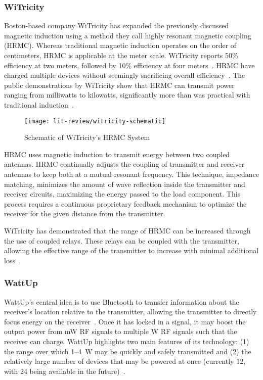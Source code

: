 \subsubsection{WiTricity}
Boston-based company WiTricity has expanded the previously discussed magnetic induction using a method they call highly resonant magnetic coupling (HRMC). Whereas traditional magnetic induction operates on the order of centimeters, HRMC is applicable at the meter scale. WiTricity reports 50\% efficiency at two meters, followed by 10\% efficiency at four meters~\cite{kesler_highly_2013,tucker_contribution_2013}. HRMC have charged multiple devices without seemingly sacrificing overall efficiency~\cite{kesler_highly_2013}. The public demonstrations by WiTricity show that HRMC can transmit power ranging from milliwatts to kilowatts, significantly more than was practical with traditional induction~\cite{kesler_highly_2013}.

\begin{figure}[t]
\centering
\texttt{[image: lit-review/witricity-schematic]}
    \caption[WiTricity schematic]{Schematic of WiTricity's HRMC System~\cite{kesler_highly_2013}}
    \label{fig:lit-review-witricity-schematic}
\end{figure}

HRMC uses magnetic induction to transmit energy between two coupled antennas. HRMC continually adjusts the coupling of transmitter and receiver antennas to keep both at a mutual resonant frequency. This technique, impedance matching, minimizes the amount of wave reflection inside the transmitter and receiver circuits, maximizing the energy passed to the load component. This process requires a continuous proprietary feedback mechanism to optimize the receiver for the given distance from the transmitter.

WiTricity has demonstrated that the range of HRMC can be increased through the use of coupled relays. These relays can be coupled with the transmitter, allowing the effective range of the transmitter to increase with minimal additional loss~\cite{butler_tour_2013}.

\subsubsection{WattUp}
WattUp's central idea is to use Bluetooth to transfer information about the receiver's location relative to the transmitter, allowing the transmitter to directly focus energy on the receiver~\cite{energouscorporation2016}. Once it has locked in a signal, it may boost the output power from mW RF signals to multiple W RF signals such that the receiver can charge. WattUp highlights two main features of its technology: (1) the range over which \numrange{1}{4}~W may be quickly and safely transmitted and (2) the relatively large number of devices that may be powered at once (currently 12, with 24 being available in the future)~\cite{energouscorporation2016}.

